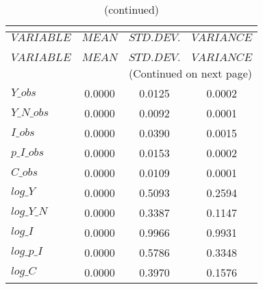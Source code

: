  
\begin{center}
\begin{longtable}{lccc} 
\caption{THEORETICAL MOMENTS}\\
 \label{Table:th_moments}\\
\toprule 
$VARIABLE   $	 & 	 $         MEAN$	 & 	 $    STD. DEV.$	 & 	 $     VARIANCE$\\
\midrule \endfirsthead 
\caption{(continued)}\\
 \toprule \\ 
$VARIABLE   $	 & 	 $         MEAN$	 & 	 $    STD. DEV.$	 & 	 $     VARIANCE$\\
\midrule \endhead 
\midrule \multicolumn{4}{r}{(Continued on next page)} \\ \bottomrule \endfoot 
\bottomrule \endlastfoot 
$Y\_obs     $	 & 	       0.0000	 & 	       0.0125	 & 	       0.0002 \\ 
$Y\_N\_obs  $	 & 	       0.0000	 & 	       0.0092	 & 	       0.0001 \\ 
$I\_obs     $	 & 	       0.0000	 & 	       0.0390	 & 	       0.0015 \\ 
$p\_I\_obs  $	 & 	       0.0000	 & 	       0.0153	 & 	       0.0002 \\ 
$C\_obs     $	 & 	       0.0000	 & 	       0.0109	 & 	       0.0001 \\ 
$log\_Y     $	 & 	       0.0000	 & 	       0.5093	 & 	       0.2594 \\ 
$log\_Y\_N  $	 & 	       0.0000	 & 	       0.3387	 & 	       0.1147 \\ 
$log\_I     $	 & 	       0.0000	 & 	       0.9966	 & 	       0.9931 \\ 
$log\_p\_I  $	 & 	       0.0000	 & 	       0.5786	 & 	       0.3348 \\ 
$log\_C     $	 & 	       0.0000	 & 	       0.3970	 & 	       0.1576 \\ 
\end{longtable}
 \end{center}
